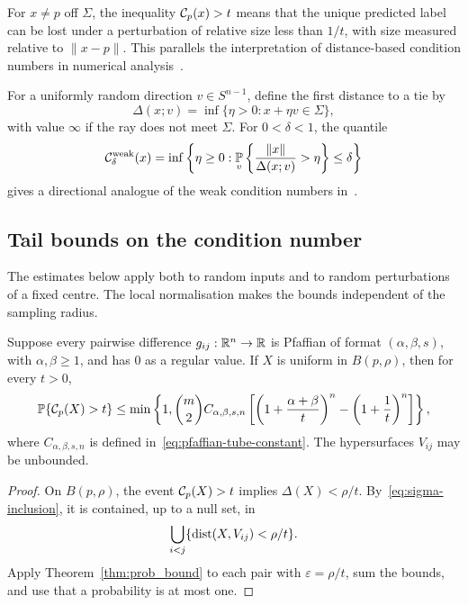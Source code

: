 For $x\ne p$ off $\Sigma$, the inequality $\mathcal{C}_p(x)>t$ means that the unique predicted label can be lost under a perturbation of relative size less than $1/t$, with size measured relative to $\|x-p\|$. This parallels the interpretation of distance-based condition numbers in numerical analysis~\cite{burgisser2013condition}.

\begin{remark}\label{rem:weak-condition}
For a uniformly random direction $v\in S^{n-1}$, define the first distance to a tie by
\[
\Delta(x;v)=\inf\{\eta>0:x+\eta v\in\Sigma\},
\]
with value $\infty$ if the ray does not meet $\Sigma$. For $0<\delta<1$, the quantile
\[
\mathcal{C}^{\mathrm{weak}}_\delta(x)=\inf\left\{\eta\ge0:
\operatorname*{\mathbb{P}}_v\left\{\frac{\|x\|}{\Delta(x;v)}>\eta\right\}\le\delta\right\}
\]
gives a directional analogue of the weak condition numbers in~\cite{lotz2020weak}. 
\end{remark}

\subsection{Tail bounds on the condition number}
The estimates below apply both to random inputs and to random perturbations of a fixed centre. The local normalisation makes the bounds independent of the sampling radius.

\begin{theorem}\label{thm:condition-uniform}
Suppose every pairwise difference $g_{ij}:\mathbb{R}^n\to\mathbb{R}$ is Pfaffian of format $(\alpha,\beta,s)$, with $\alpha,\beta\ge1$, and has $0$ as a regular value. If $X$ is uniform in $B(p,\rho)$, then for every $t>0$,
\begin{equation}\label{eq:general-condition-tail}
\operatorname*{\mathbb{P}}\{\mathcal{C}_p(X)>t\}\le
\min\left\{1,\binom m2 C_{\alpha,\beta,s,n}
\left[\left(1+\frac{\alpha+\beta}{t}\right)^n
-\left(1+\frac1t\right)^n\right]\right\},
\end{equation}
where $C_{\alpha,\beta,s,n}$ is defined in~\eqref{eq:pfaffian-tube-constant}. The hypersurfaces $V_{ij}$ may be unbounded.
\end{theorem}

\begin{proof}
On $B(p,\rho)$, the event $\mathcal{C}_p(X)>t$ implies $\Delta(X)<\rho/t$. By~\eqref{eq:sigma-inclusion}, it is contained, up to a null set, in
\[
\bigcup_{i<j}\{\operatorname{dist}(X,V_{ij})<\rho/t\}.
\]
Apply Theorem~\ref{thm:prob_bound} to each pair with $\varepsilon=\rho/t$, sum the bounds, and use that a probability is at most one.
\end{proof}


